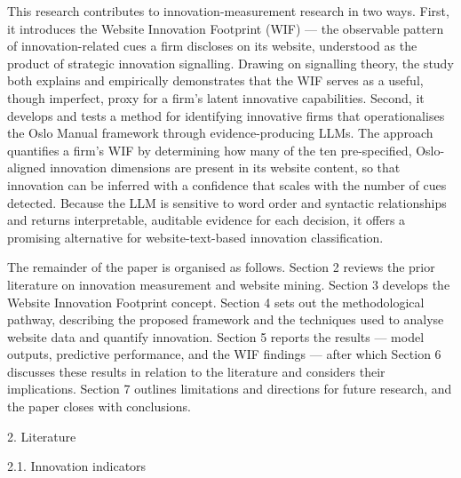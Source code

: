 \documentclass[runningheads]{llncs}
\begin{document}
This research contributes to innovation-measurement research in two ways. First, it introduces the Website Innovation Footprint (WIF) — the observable pattern of innovation-related cues a firm discloses on its website, understood as the product of strategic innovation signalling. Drawing on signalling theory, the study both explains and empirically demonstrates that the WIF serves as a useful, though imperfect, proxy for a firm's latent innovative capabilities. Second, it develops and tests a method for identifying innovative firms that operationalises the Oslo Manual framework through evidence-producing LLMs. The approach quantifies a firm's WIF by determining how many of the ten pre-specified, Oslo-aligned innovation dimensions are present in its website content, so that innovation can be inferred with a confidence that scales with the number of cues detected. Because the LLM is sensitive to word order and syntactic relationships and returns interpretable, auditable evidence for each decision, it offers a promising alternative for website-text-based innovation classification.

The remainder of the paper is organised as follows. Section 2 reviews the prior literature on innovation measurement and website mining. Section 3 develops the Website Innovation Footprint concept. Section 4 sets out the methodological pathway, describing the proposed framework and the techniques used to analyse website data and quantify innovation. Section 5 reports the results — model outputs, predictive performance, and the WIF findings — after which Section 6 discusses these results in relation to the literature and considers their implications. Section 7 outlines limitations and directions for future research, and the paper closes with conclusions.

2. Literature

2.1. Innovation indicators

\end{document}

